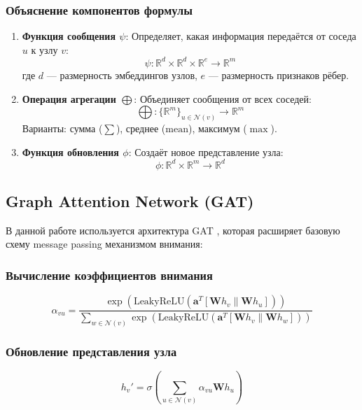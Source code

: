 \documentclass[12pt,a4paper]{article}
\begin{document}
\subsubsection{Объяснение компонентов формулы}
\begin{enumerate}
    \item \textbf{Функция сообщения $\psi$}: Определяет, какая информация передаётся от соседа $u$ к узлу $v$:
    \[
    \psi: \mathbb{R}^d \times \mathbb{R}^d \times \mathbb{R}^e \to \mathbb{R}^m
    \]
    где $d$ — размерность эмбеддингов узлов, $e$ — размерность признаков рёбер.
    
    \item \textbf{Операция агрегации $\bigoplus$}: Объединяет сообщения от всех соседей:
    \[
    \bigoplus: \{\mathbb{R}^m\}_{u \in \mathcal{N}(v)} \to \mathbb{R}^m
    \]
    Варианты: сумма ($\sum$), среднее ($\text{mean}$), максимум ($\max$).
    
    \item \textbf{Функция обновления $\phi$}: Создаёт новое представление узла:
    \[
    \phi: \mathbb{R}^d \times \mathbb{R}^m \to \mathbb{R}^d
    \]
\end{enumerate}

\subsection{Graph Attention Network (GAT)}
В данной работе используется архитектура GAT \cite{velickovic2018graph}, которая расширяет базовую схему message passing механизмом внимания:

\subsubsection{Вычисление коэффициентов внимания}
\begin{equation}
\alpha_{vu} = \frac{\exp\left(\text{LeakyReLU}\left(\mathbf{a}^T [\mathbf{W}h_v \| \mathbf{W}h_u]\right)\right)}{\sum_{w \in \mathcal{N}(v)} \exp\left(\text{LeakyReLU}\left(\mathbf{a}^T [\mathbf{W}h_v \| \mathbf{W}h_w]\right)\right)}
\end{equation}

\subsubsection{Обновление представления узла}
\begin{equation}
h_v' = \sigma\left(\sum_{u \in \mathcal{N}(v)} \alpha_{vu} \mathbf{W} h_u\right)
\end{equation}
\end{document}
